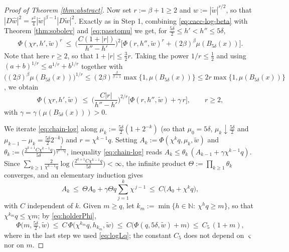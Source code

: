 \documentclass[10pt,a4paper]{amsart}
\newcommand{\N}{\mathbb{N}}
\begin{document}
\begin{proof}[Proof of Theorem \ref{thm:abstract}]
Now set $r:=\beta+1\ge2$ and $\widehat w:=|\widetilde w|^{r/2}$, so that
$|D\widehat w|^2=\frac{r^2}{4}|\widetilde w|^{\beta-1}|D\widetilde w|^2$. Exactly as in Step 1,
combining \eqref{eq:cacc-log-beta} with Theorem \ref{thm:sobolev} and \eqref{eq:passtomu} we get,
for $\frac{5\delta}{2}\le h'<h''\le5\delta$,
\[
\Phi(\chi r,h',\widetilde w)^{r}\ \le\ \Big(\frac{C(1+|r|)}{h''-h'}\Big)^{2}
\Big[\Phi(r,h'',\widetilde w)^{r}+(2\beta)^{\beta}\mu(B_{5\delta}(x))\Big] .
\]
Note that here $r\ge2$, so that $1+|r|\le\frac32 r$.
Taking the power $1/r\le\frac12$ and using $(a+b)^{1/r}\le a^{1/r}+b^{1/r}$ together with
$\big((2\beta)^{\beta}\mu(B_{5\delta}(x))\big)^{1/r}\le(2\beta)^{\frac{\beta}{\beta+1}}\max\{1,\mu(B_{5\delta}(x))\}
\le 2r\max\{1,\mu(B_{5\delta}(x))\}$, we obtain
\begin{equation}\label{eq:chain-log}
\Phi(\chi r,h',\widetilde w)\ \le\ \Big(\frac{C|r|}{h''-h'}\Big)^{2/r}
\Big[\Phi(r,h'',\widetilde w)+\gamma\,r\Big],\qquad r\ge2 ,
\end{equation}
with $\gamma=\gamma(\mu(B_{5\delta}(x)))>0$.

We iterate \eqref{eq:chain-log} along $\mu_k:=\frac{5\delta}{2}(1+2^{-k})$ (so that
$\mu_0=5\delta$, $\mu_k\downarrow\frac{5\delta}{2}$ and $\mu_{k-1}-\mu_k=\frac{5\delta}{2}2^{-k}$)
and $r=\chi^{k-1}q$. Setting $A_k:=\Phi(\chi^{k}q,\mu_k,\widetilde w)$ and
$\theta_k:=\big(\tfrac{2^{k+1}C\chi^{k-1}q}{5\delta}\big)^{\frac{2}{\chi^{k-1}q}}$, inequality
\eqref{eq:chain-log} reads $A_k\le\theta_k\,(A_{k-1}+\gamma\chi^{k-1}q)$. Since
$\sum_{k\ge1}\frac{2}{\chi^{k-1}q}\log\big(\tfrac{2^{k+1}C\chi^{k-1}q}{5\delta}\big)<\infty$, the
infinite product $\Theta:=\prod_{k\ge1}\theta_k$ converges, and an elementary induction gives
\[
A_k\ \le\ \Theta A_0+\gamma\Theta q\sum_{j=1}^{k}\chi^{\,j-1}\ \le\ C\big(A_0+\chi^{k}q\big) ,
\]
with $C$ independent of $k$. Given $m\ge q$, let $k_m:=\min\{h\in\N:\ \chi^{h}q\ge m\}$, so that
$\chi^{k_m}q\le\chi m$; by \eqref{eq:holderPhi},
\begin{equation}\label{eq:momentbound}
\Phi\big(m,\tfrac{5\delta}{2},\widetilde w\big)\ \le\
C\,\Phi\big(\chi^{k_m}q,h_{k_m},\widetilde w\big)\ \le\ C\big(\Phi(q,5\delta,\widetilde w)+m\big)
\ \le\ C_5\,(1+m),
\end{equation}
where in the last step we used \eqref{eq:logLq}; the constant $C_5$ does not depend on $\varsigma$
nor on $m$.


\end{proof}
\end{document}
